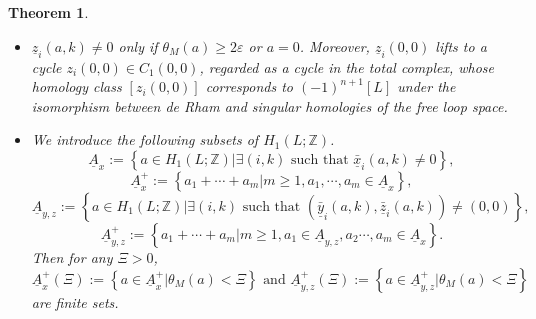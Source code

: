 \documentclass[a4paper]{article}
\newtheorem{theorem}{Theorem}
\numberwithin{equation}{section}
\begin{document}
\begin{theorem}
\begin{itemize}
\item[(vi)] $\underline{z}_i(a,k)\neq0$ only if $\theta_M(a)\geq2\varepsilon$ or $a=0$. Moreover, $\underline{z}_i(0,0)$ lifts to a cycle $z_i(0,0)\in C_1(0,0)$, regarded as a cycle in the total complex, whose homology class $\left[{z}_i(0,0)\right]$ corresponds to $(-1)^{n+1}[L]$ under the isomorphism between de Rham and singular homologies of the free loop space.
\item[(vii)] We introduce the following subsets of $H_1(L;\mathbb{Z})$.
\begin{equation}\label{eq:A1}
\underline{A}_x:=\left\{a\in H_1(L;\mathbb{Z})\vert\exists(i,k)\textrm{ such that }\bar{\underline{x}}_i(a,k)\neq0\right\},
\end{equation}
\begin{equation}\label{eq:A2}
\underline{A}_x^+:=\left\{a_1+\cdots+a_m\vert m\geq1, a_1,\cdots,a_m\in\underline{A}_x\right\},
\end{equation}
\begin{equation}\label{eq:A3}
\underline{A}_{y,z}:=\left\{a\in H_1(L;\mathbb{Z})\vert\exists(i,k)\textrm{ such that }\left(\bar{\underline{y}}_i(a,k),\bar{\underline{z}}_i(a,k)\right)\neq(0,0)\right\},
\end{equation}
\begin{equation}\label{eq:A4}
\underline{A}_{y,z}^+:=\left\{a_1+\cdots+a_m\vert m\geq1, a_1\in\underline{A}_{y,z},a_2\cdots,a_m\in\underline{A}_x\right\}.
\end{equation}
Then for any $\Xi>0$,
\begin{equation}
\underline{A}_x^+(\Xi):=\left\{a\in\underline{A}_x^+\vert\theta_M(a)<\Xi\right\}\textrm{ and }\underline{A}_{y,z}^+(\Xi):=\left\{a\in\underline{A}_{y,z}^+\vert\theta_M(a)<\Xi\right\}
\end{equation}
are finite sets.
\end{itemize}
\end{theorem}
\end{document}
